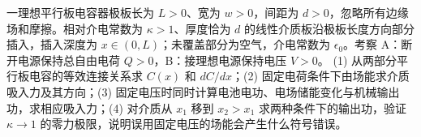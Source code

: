 一理想平行板电容器极板长为 \(L>0\)、宽为 \(w>0\)，间距为 \(d>0\)，忽略所有边缘场和摩擦。相对介电常数为 \(\kappa>1\)、厚度恰为 \(d\) 的线性介质板沿极板长度方向部分插入，插入深度为 \(x\in(0,L)\)；未覆盖部分为空气，介电常数为 \(\epsilon_0\)。考察 A：断开电源保持总自由电荷 \(Q>0\)，B：接理想电源保持电压 \(V>0\)。
(1) 从两部分平行板电容的等效连接关系求 \(C(x)\) 和 \(dC/dx\)；(2) 固定电荷条件下由场能求介质吸入力及其方向；(3) 固定电压时同时计算电池电功、电场储能变化与机械输出功，求相应吸入力；(4) 对介质从 \(x_1\) 移到 \(x_2>x_1\) 求两种条件下的输出功，验证 \(\kappa\to1\) 的零力极限，说明误用固定电压的场能会产生什么符号错误。
